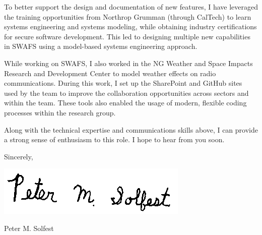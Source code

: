 \documentclass[letterpaper,11pt]{article}
\begin{document}
To better support the design and documentation of new features, I have leveraged the training opportunities
from Northrop Grumman (through CalTech) to learn systems engineering and systems modeling, while obtaining
industry certifications for secure software development.
This led to designing multiple new capabilities in SWAFS using a model-based systems engineering approach.

While working on SWAFS, I also worked in the NG Weather and Space Impacts Research and Development Center
to model weather effects on radio communications.
During this work, I set up the SharePoint and GitHub sites used by the team to improve
the collaboration opportunities across sectors and within the team.
These tools also enabled the usage of modern, flexible coding processes within the
research group.

Along with the technical expertise and communications skills above, I can provide a strong
sense of enthusiasm to this role. I hope to hear from you soon.


Sincerely,

\includegraphics[height=.5in]{signature.png}

Peter M. Solfest
\end{document}
